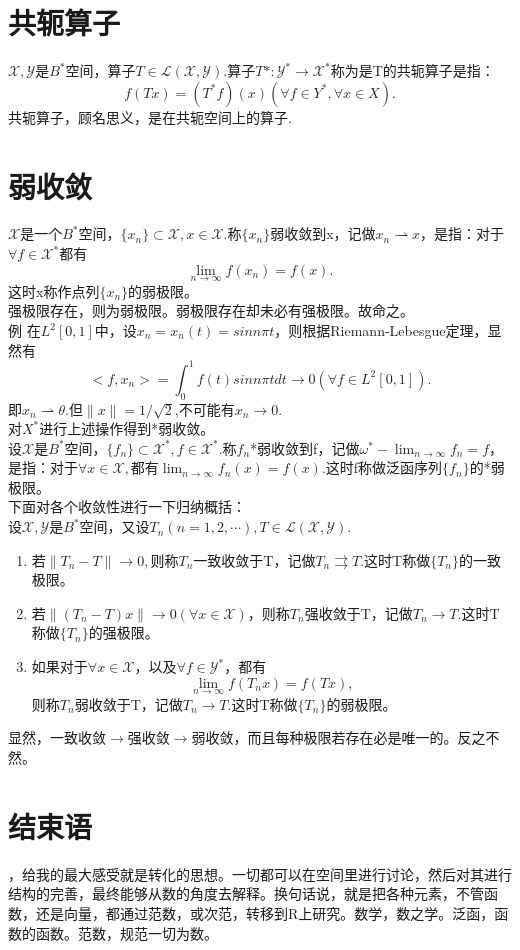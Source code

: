 \documentclass[a4paper,12pt]{article}
\begin{document}
\begin{CJK*}{UTF8}{gbsn}
	\section{共轭算子}
	\quad{}$\mathcal{X},\mathcal{Y}$是$B^*$空间，算子$T\in \mathcal{L}(\mathcal{X},\mathcal{Y}).$算子$T*:\mathcal{Y}^*\to\mathcal{X}^*$称为是T的共轭算子是指：
	$$f(Tx) = (T^*f)(x) (\forall f \in Y^*,\forall x\in X).$$
	共轭算子，顾名思义，是在共轭空间上的算子.
	\section{弱收敛}
	\quad{}$\mathcal{X}$是一个$B^*$空间，$\{x_n\} \subset \mathcal{X},x\in \mathcal{X}.$称$\{x_n\}$弱收敛到x，记做$x_n\rightharpoonup x$，是指：对于$\forall f \in \mathcal{X}^*$都有
	$$\lim_{n\to \infty}f(x_n) = f(x).$$
	这时x称作点列$\{x_n\}$的弱极限。\\
	强极限存在，则为弱极限。弱极限存在却未必有强极限。故命之。\\
	例 在$L^2[0,1]$中，设$x_n=x_n(t)=sinn\pi t$，则根据Riemann-Lebesgue定理，显然有
	$$<f,x_n> = \int_0^1f(t)sinn\pi t dt \to 0 (\forall f \in L^2[0,1]).$$
	即$x_n \rightharpoonup \theta$.但$\|x\|=1/\sqrt{2}$,不可能有$x_n \to 0$.\\
	对$X^*$进行上述操作得到*弱收敛。\\
	设$\mathcal{X}$是$B^*$空间，$\{f_n\}\subset\mathcal{X}^*,f\in\mathcal{X}^*$.称$f_n$*弱收敛到f，记做$\omega^*-\lim_{n\to\infty}f_n=f$，是指：对于$\forall x\in \mathcal{X},$都有$\lim_{n\to\infty}f_n(x)=f(x).$这时f称做泛函序列$\{f_n\}$的*弱极限。\\
	下面对各个收敛性进行一下归纳概括：\\
	设$\mathcal{X},\mathcal{Y}$是$B^*$空间，又设$T_n(n=1,2,\cdots),T\in\mathcal{L}(\mathcal{X},\mathcal{Y}).$
	\begin{enumerate}
		\item 若$\|T_n - T \| \to 0,$则称$T_n$一致收敛于T，记做$T_n \rightrightarrows T$.这时T称做$\{T_n\}$的一致极限。
		\item 若$\|(T_n-T)x\|\to 0(\forall x\in \mathcal{X})$，则称$T_n$强收敛于T，记做$T_n\to T$.这时T称做$\{T_n\}$的强极限。
		\item 如果对于$\forall x \in \mathcal{X}$，以及$\forall f\in \mathcal{Y}^*$，都有
			$$\lim_{n\to\infty}f(T_nx)=f(Tx),$$
			则称$T_n$弱收敛于T，记做$T_n\to T$.这时T称做$\{T_n\}$的弱极限。
	\end{enumerate}
	显然，一致收敛$\rightarrow$强收敛$\rightarrow$弱收敛，而且每种极限若存在必是唯一的。反之不然。
	\section{结束语}
	\quad{}，给我的最大感受就是转化的思想。一切都可以在空间里进行讨论，然后对其进行结构的完善，最终能够从数的角度去解释。换句话说，就是把各种元素，不管函数，还是向量，都通过范数，或次范，转移到R上研究。数学，数之学。泛函，函数的函数。范数，规范一切为数。
\end{CJK*}
\end{document}
